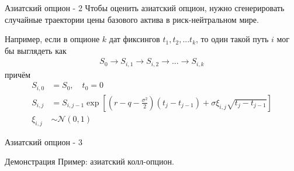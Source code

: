 \documentclass{beamer}
\begin{document}
\begin{frame}{Азиатский опцион - 2}
\justify
Чтобы оценить азиатский опцион, нужно сгенерировать случайные траектории цены базового актива в риск-нейтральном мире.

\justify
Например, если в опционе $k$ дат фиксингов $t_1, t_2, ... t_k$, то один такой путь $i$ мог бы выглядеть как 
\begin{align*}
S_0 \to S_{i,1} \to S_{i,2} \to ... \to S_{i,k}
\end{align*}
причём
\begin{align*}
S_{i,0} &= S_0, \quad t_0 = 0 \\
S_{i,j} &= S_{i,j-1} \exp\left[\left(r - q - \frac{\sigma^2}{2}\right)(t_j - t_{j-1}) + \sigma\xi_{i,j}\sqrt{t_j - t_{j-1}}\right] \\
\xi_{i,j} &\sim \mathcal{N}(0, 1)
\end{align*}
\end{frame}



\newcommand{\plotStockPath}[2] {
	
	\addplot[
		mark = *,
		color = #2,
		thick
	]
	table[
		x = t,
		y = stock_price,
		col sep = comma,
		discard if not={path}{#1}
	]
	{monte_carlo_paths.csv};
}

\begin{frame}{Азиатский опцион - 3}
\centering
{}
\end{frame}



\begin{frame}{Демонстрация}
\justify
Пример: азиатский колл-опцион.
\end{frame}
\end{document}
